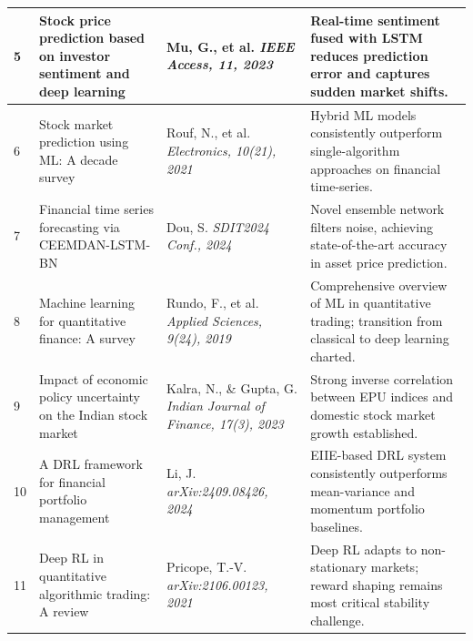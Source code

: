 \documentclass[12pt,a4paper,oneside]{report}
\theoremstyle{definition}
\theoremstyle{remark}
\begin{document}
\begin{center}
\begin{longtable}{|p{0.8cm}|p{4.2cm}|>{\raggedright\arraybackslash}p{4cm}|p{4.5cm}|}
5 & Stock price prediction based on investor sentiment and deep learning \cite{Mu2023SentimentLSTM} & Mu, G., et al. \newline\newline \textit{IEEE Access, 11, 2023} & Real-time sentiment fused with LSTM reduces prediction error and captures sudden market shifts. \\ \hline

6 & Stock market prediction using ML: A decade survey \cite{Rouf2021Survey} & Rouf, N., et al. \newline\newline \textit{Electronics, 10(21), 2021} & Hybrid ML models consistently outperform single-algorithm approaches on financial time-series. \\ \hline

7 & Financial time series forecasting via CEEMDAN-LSTM-BN \cite{Dou2024CEEMDAN} & Dou, S. \newline\newline \textit{SDIT2024 Conf., 2024} & Novel ensemble network filters noise, achieving state-of-the-art accuracy in asset price prediction. \\ \hline

8 & Machine learning for quantitative finance: A survey \cite{Rundo2019MLQuantFinance} & Rundo, F., et al. \newline\newline \textit{Applied Sciences, 9(24), 2019} & Comprehensive overview of ML in quantitative trading; transition from classical to deep learning charted. \\ \hline

9 & Impact of economic policy uncertainty on the Indian stock market \cite{Kalra2023EPU} & Kalra, N., \& Gupta, G. \newline\newline \textit{Indian Journal of Finance, 17(3), 2023} & Strong inverse correlation between EPU indices and domestic stock market growth established. \\ \hline

10 & A DRL framework for financial portfolio management \cite{Li2024EIIEPortfolio} & Li, J. \newline\newline \textit{arXiv:2409.08426, 2024} & EIIE-based DRL system consistently outperforms mean-variance and momentum portfolio baselines. \\ \hline

11 & Deep RL in quantitative algorithmic trading: A review \cite{Pricope2021DRLAlgoTrading} & Pricope, T.-V. \newline\newline \textit{arXiv:2106.00123, 2021} & Deep RL adapts to non-stationary markets; reward shaping remains most critical stability challenge. \\ \hline


\end{longtable}
\end{center}
\end{document}
